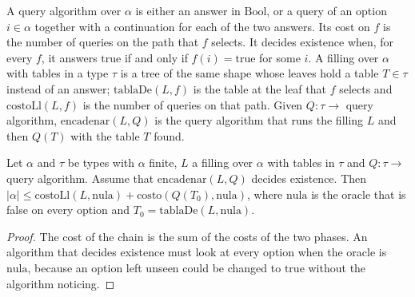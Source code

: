 \begin{definition}
  \label{def:information-filling}
  \leanok
  A query algorithm over $\alpha$ is either an answer in $\mathrm{Bool}$, or a query of an option
  $i \in \alpha$ together with a continuation for each of the two answers. Its cost on $f$ is the
  number of queries on the path that $f$ selects. It decides existence when, for every $f$, it
  answers $\mathrm{true}$ if and only if $f(i) = \mathrm{true}$ for some $i$. A filling over
  $\alpha$ with tables in a type $\tau$ is a tree of the same shape whose leaves hold a table
  $T \in \tau$ instead of an answer; $\mathrm{tablaDe}(L, f)$ is the table at the leaf that $f$
  selects and $\mathrm{costoLl}(L, f)$ is the number of queries on that path. Given $Q : \tau \to$
  query algorithm, $\mathrm{encadenar}(L, Q)$ is the query algorithm that runs the filling $L$ and
  then $Q(T)$ with the table $T$ found.
  \own{}
\end{definition}

\begin{theorem}
  \label{thm:information-work-conserved}
  \leanok
  Let $\alpha$ and $\tau$ be types with $\alpha$ finite, $L$ a filling over $\alpha$ with tables in
  $\tau$ and $Q : \tau \to$ query algorithm. Assume that $\mathrm{encadenar}(L, Q)$ decides
  existence. Then $|\alpha| \le \mathrm{costoLl}(L, \mathrm{nula}) + \mathrm{costo}(Q(T_0),
  \mathrm{nula})$, where $\mathrm{nula}$ is the oracle that is false on every option and $T_0 =
  \mathrm{tablaDe}(L, \mathrm{nula})$.
  \own{}
\end{theorem}

\begin{proof}
  \leanok
  The cost of the chain is the sum of the costs of the two phases. An algorithm that decides
  existence must look at every option when the oracle is $\mathrm{nula}$, because an option left
  unseen could be changed to $\mathrm{true}$ without the algorithm noticing.
\end{proof}

